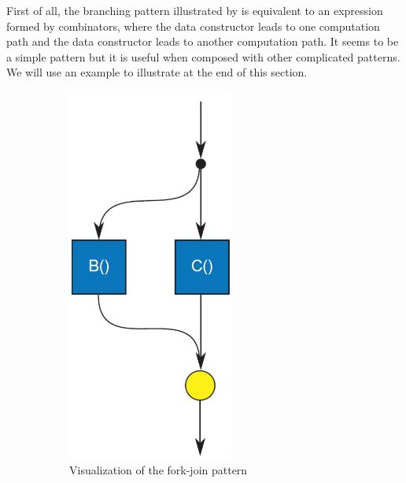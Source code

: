 First of all, the branching pattern illustrated by  is equivalent to an expression formed by \hask{|||} combinators, where the data constructor  leads to one computation path and the data constructor  leads to another computation path. It seems to be a simple pattern but it is useful when composed with other complicated patterns. We will use an example to illustrate at the end of this section.
\begin{figure}[ht]
    \begin{subfigure}[b]{0.475\textwidth}
       \centering
       \includegraphics[width=0.60\textwidth]{arrow/fork.png}
        \caption{Visualization of the fork-join pattern \cite{mccoolStructuredParallelPrograming2012}}
        \label{SArrow:fig:fork}
    \end{subfigure}
    \hfill
   \begin{subfigure}[b]{0.475\textwidth}
        \centering

\end{subfigure}
\end{figure}
